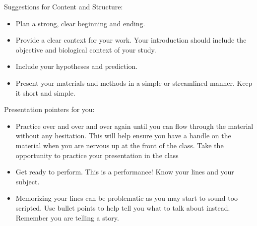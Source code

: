 \documentclass[
]{book}
\providecommand{\tightlist}{%
  \setlength{\itemsep}{0pt}\setlength{\parskip}{0pt}}
\begin{document}
Suggestions for Content and Structure:

\begin{itemize}
\tightlist
\item
  Plan a strong, clear beginning and ending.
\item
  Provide a clear context for your work. Your introduction should include the objective and biological context of your study.
\item
  Include your hypotheses and prediction.
\item
  Present your materials and methods in a simple or streamlined manner. Keep it short and simple.
\end{itemize}

Presentation pointers for you:

\begin{itemize}
\tightlist
\item
  Practice over and over and over again until you can flow through the material without any hesitation. This will help ensure you have a handle on the material when you are nervous up at the front of the class. Take the opportunity to practice your presentation in the class
\item
  Get ready to perform. This is a performance! Know your lines and your subject.
\item
  Memorizing your lines can be problematic as you may start to sound too scripted. Use bullet points to help tell you what to talk about instead. Remember you are telling a story.


\end{itemize}
\end{document}
